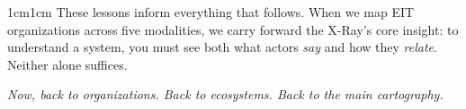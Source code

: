 \documentclass[../main.tex]{subfiles}
\begin{document}
\begin{adjustwidth}{1cm}{1cm}
These lessons inform everything that follows. When we map EIT organizations across five modalities, we carry forward the X-Ray's core insight: to understand a system, you must see both what actors \textit{say} and how they \textit{relate}. Neither alone suffices.

\vspace{1cm}

\begin{center}
\textit{Now, back to organizations. Back to ecosystems. Back to the main cartography.}
\end{center}

\vspace{0.5cm}

\begin{center}
\end{center}

\end{adjustwidth}

\closeintermezzo
\end{document}
